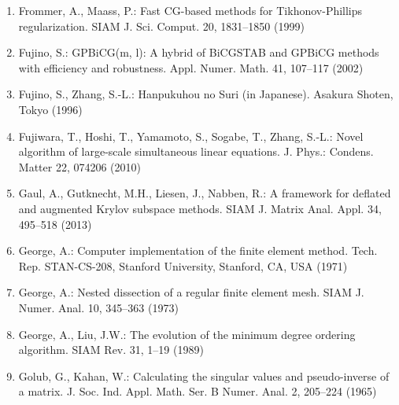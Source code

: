 \begin{enumerate}[label=\arabic*.,ref=\arabic*,leftmargin=3em]
\item\label{bib:source-70}Frommer, A., Maass, P.: Fast CG-based methods for Tikhonov-Phillips regularization. SIAM J. Sci. Comput. 20, 1831–1850 (1999)

\item\label{bib:source-71}Fujino, S.: GPBiCG(m, l): A hybrid of BiCGSTAB and GPBiCG methods with efficiency and robustness. Appl. Numer. Math. 41, 107–117 (2002)

\item\label{bib:source-72}Fujino, S., Zhang, S.-L.: Hanpukuhou no Suri (in Japanese). Asakura Shoten, Tokyo (1996)

\item\label{bib:source-73}Fujiwara, T., Hoshi, T., Yamamoto, S., Sogabe, T., Zhang, S.-L.: Novel algorithm of large-scale simultaneous linear equations. J. Phys.: Condens. Matter 22, 074206 (2010)

\item\label{bib:source-74}Gaul, A., Gutknecht, M.H., Liesen, J., Nabben, R.: A framework for deflated and augmented Krylov subspace methods. SIAM J. Matrix Anal. Appl. 34, 495–518 (2013)

\item\label{bib:source-75}George, A.: Computer implementation of the finite element method. Tech. Rep. STAN-CS-208, Stanford University, Stanford, CA, USA (1971)

\item\label{bib:source-76}George, A.: Nested dissection of a regular finite element mesh. SIAM J. Numer. Anal. 10, 345–363 (1973)

\item\label{bib:source-77}George, A., Liu, J.W.: The evolution of the minimum degree ordering algorithm. SIAM Rev. 31, 1–19 (1989)

\item\label{bib:source-78}Golub, G., Kahan, W.: Calculating the singular values and pseudo-inverse of a matrix. J. Soc. Ind. Appl. Math. Ser. B Numer. Anal. 2, 205–224 (1965)


\end{enumerate}
